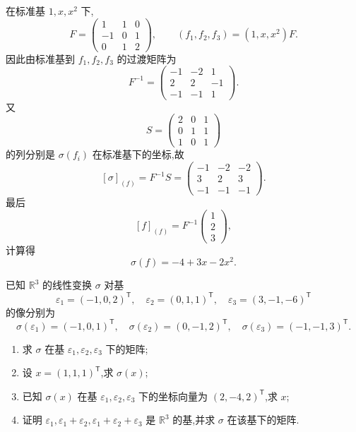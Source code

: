 \begin{solution}
在标准基 $1,x,x^2$ 下,
\[
F=
\begin{pmatrix}
1&1&0\\
-1&0&1\\
0&1&2
\end{pmatrix},
\qquad
(f_1,f_2,f_3)=(1,x,x^2)F.
\]
因此由标准基到 $f_1,f_2,f_3$ 的过渡矩阵为
\[
\boxed{
F^{-1}
=
\begin{pmatrix}
-1&-2&1\\
2&2&-1\\
-1&-1&1
\end{pmatrix}
}.
\]
又
\[
S=
\begin{pmatrix}
2&0&1\\
0&1&1\\
1&0&1
\end{pmatrix}
\]
的列分别是 $\sigma(f_i)$ 在标准基下的坐标,故
\[
[\sigma]_{(f)}
=
F^{-1}S
=
\boxed{
\begin{pmatrix}
-1&-2&-2\\
3&2&3\\
-1&-1&-1
\end{pmatrix}
}.
\]
最后
\[
[f]_{(f)}=F^{-1}
\begin{pmatrix}1\\2\\3\end{pmatrix},
\]
计算得
\[
\boxed{\sigma(f)=-4+3x-2x^2}.
\]
\end{solution}


\begin{example}
已知 $\mathbb{R}^3$ 的线性变换 $\sigma$ 对基
\[
\varepsilon_1=(-1,0,2)^{\mathsf T},\quad
\varepsilon_2=(0,1,1)^{\mathsf T},\quad
\varepsilon_3=(3,-1,-6)^{\mathsf T}
\]
的像分别为
\[
\sigma(\varepsilon_1)=(-1,0,1)^{\mathsf T},\quad
\sigma(\varepsilon_2)=(0,-1,2)^{\mathsf T},\quad
\sigma(\varepsilon_3)=(-1,-1,3)^{\mathsf T}.
\]
\begin{enumerate}
    \item 求 $\sigma$ 在基 $\varepsilon_1,\varepsilon_2,\varepsilon_3$ 下的矩阵;
    \item 设 $x=(1,1,1)^{\mathsf T}$,求 $\sigma(x)$;
    \item 已知 $\sigma(x)$ 在基 $\varepsilon_1,\varepsilon_2,\varepsilon_3$ 下的坐标向量为 $(2,-4,2)^{\mathsf T}$,求 $x$;
    \item 证明 $\varepsilon_1,\varepsilon_1+\varepsilon_2,
    \varepsilon_1+\varepsilon_2+\varepsilon_3$ 是 $\mathbb{R}^3$ 的基,并求
    $\sigma$ 在该基下的矩阵.
\end{enumerate}
\end{example}
\exampleblank

